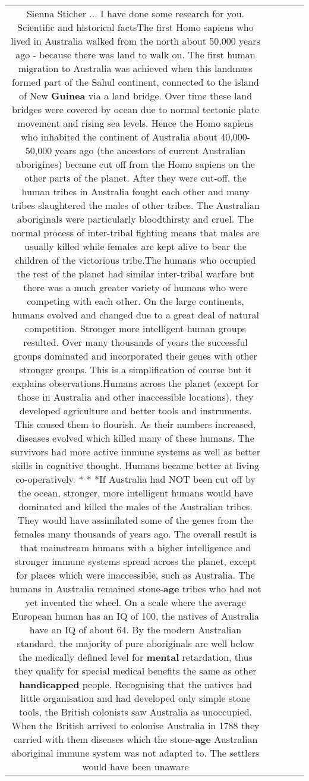 \documentclass[11pt]{article}
\newlength\mylength
\begin{document}
\begin{center}
\begin{longtable}{|C{.65\mylength}|C{.30\mylength}|C{.12\mylength}|C{.12\mylength}|C{.12\mylength}|}
  \small Sienna Sticher ... I have done some research for you. Scientific and historical factsThe first Homo sapiens who lived in Australia walked from the north about 50,000 years ago - because there was land to walk on. The first human migration to Australia was achieved when this landmass formed part of the Sahul continent, connected to the island of New \textbf{Guinea} via a land bridge. Over time these land bridges were covered by ocean due to normal tectonic plate movement and rising sea levels. Hence the Homo sapiens who inhabited the continent of Australia about 40,000-50,000 years ago (the ancestors of current Australian aborigines) became cut off from the Homo sapiens on the other parts of the planet. After they were cut-off, the human tribes in Australia fought each other and many tribes slaughtered the males of other tribes. The Australian aboriginals were particularly bloodthirsty and cruel. The normal process of inter-tribal fighting means that males are usually killed while females are kept alive to bear the children of the victorious tribe.The humans who occupied the rest of the planet had similar inter-tribal warfare but there was a much greater variety of humans who were competing with each other. On the large continents, humans evolved and changed due to a great deal of natural competition. Stronger more intelligent human groups resulted. Over many thousands of years the successful groups dominated and incorporated their genes with other stronger groups. This is a simplification of course but it explains observations.Humans across the planet (except for those in Australia and other inaccessible locations), they developed agriculture and better tools and instruments. This caused them to flourish. As their numbers increased, diseases evolved which killed many of these humans. The survivors had more active immune systems as well as better skills in cognitive thought. Humans became better at living co-operatively.   * * *If Australia had NOT been cut off by the ocean, stronger, more intelligent humans would have dominated and killed the males of the Australian tribes. They would have assimilated some of the genes from the females many thousands of years ago. The overall result is that mainstream humans with a higher intelligence and stronger immune systems spread across the planet, except for places which were inaccessible, such as Australia. The humans in Australia remained stone-\textbf{age} tribes who had not yet invented the wheel. On a scale where the average European human has an IQ of 100, the natives of Australia have an IQ of about 64. By the modern Australian standard, the majority of pure aboriginals are well below the medically defined level for \textbf{mental} retardation, thus they qualify for special medical benefits the same as other \textbf{handicapped} people. Recognising that the natives had little organisation and had developed only simple stone tools, the British colonists saw Australia as unoccupied. When the British arrived to colonise Australia in 1788 they carried with them diseases which the stone-\textbf{age} Australian aboriginal immune system was not adapted to. The settlers would have been unaware 
\end{longtable}
\end{center}
\end{document}
